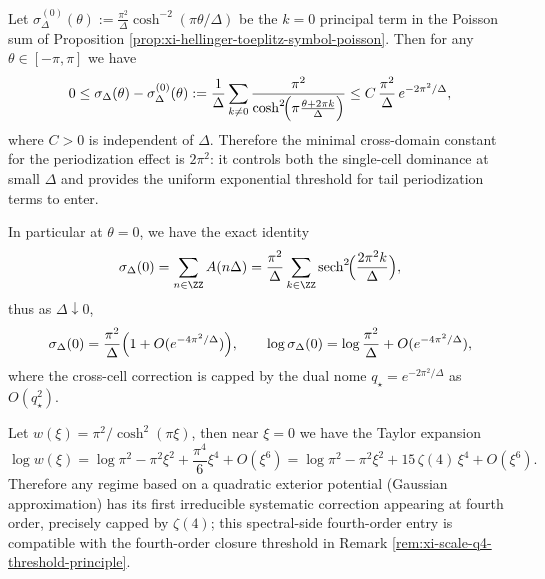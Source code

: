 \begin{remark}\label{rem:xi-hellinger-toeplitz-periodization-constant-2pi2}
Let \(\sigma_\Delta^{(0)}(\theta):=\frac{\pi^2}{\Delta}\cosh^{-2}(\pi\theta/\Delta)\) be the \(k=0\) principal term in the Poisson sum of Proposition \ref{prop:xi-hellinger-toeplitz-symbol-poisson}.
Then for any \(\theta\in[-\pi,\pi]\) we have
\[
0\le \sigma_\Delta(\theta)-\sigma_\Delta^{(0)}(\theta)
:=\frac{1}{\Delta}\sum_{k\neq 0}\frac{\pi^{2}}{\cosh^{2}\!\Bigl(\pi\frac{\theta+2\pi k}{\Delta}\Bigr)}
\le C\,\frac{\pi^{2}}{\Delta}\,e^{-2\pi^{2}/\Delta},
\]
where \(C>0\) is independent of \(\Delta\).
Therefore the minimal cross-domain constant for the periodization effect is \(2\pi^2\): it controls both the single-cell dominance at small \(\Delta\) and provides the uniform exponential threshold for tail periodization terms to enter.
\par
In particular at \(\theta=0\), we have the exact identity
\[
\sigma_\Delta(0)=\sum_{n\in\ZZ}A(n\Delta)
=\frac{\pi^{2}}{\Delta}\sum_{k\in\ZZ}\mathrm{sech}^{2}\!\Bigl(\frac{2\pi^{2}k}{\Delta}\Bigr),
\]
thus as \(\Delta\downarrow 0\),
\[
\sigma_\Delta(0)=\frac{\pi^{2}}{\Delta}\Bigl(1+O(e^{-4\pi^{2}/\Delta})\Bigr),
\qquad
\log\sigma_\Delta(0)=\log\frac{\pi^{2}}{\Delta}+O(e^{-4\pi^{2}/\Delta}),
\]
where the cross-cell correction is capped by the dual nome \(q_\star=e^{-2\pi^{2}/\Delta}\) as \(O(q_\star^{2})\).
\end{remark}

\begin{remark}\label{rem:xi-hellinger-logw-zeta4-entry}
Let \(w(\xi)=\pi^2/\cosh^2(\pi\xi)\), then near \(\xi=0\) we have the Taylor expansion
\[
\log w(\xi)=\log\pi^2-\pi^2\xi^2+\frac{\pi^4}{6}\xi^4+O(\xi^6)
=\log\pi^2-\pi^2\xi^2+15\,\zeta(4)\,\xi^4+O(\xi^6).
\]
Therefore any regime based on a quadratic exterior potential (Gaussian approximation) has its first irreducible systematic correction appearing at fourth order, precisely capped by \(\zeta(4)\);
this spectral-side fourth-order entry is compatible with the fourth-order closure threshold in Remark \ref{rem:xi-scale-q4-threshold-principle}.
\end{remark}

